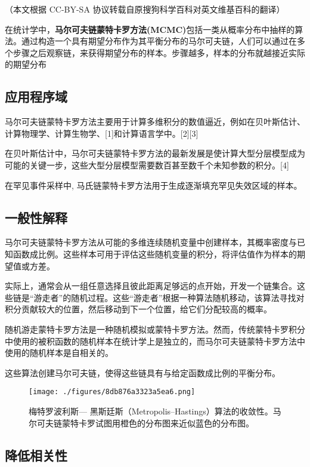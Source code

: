 
（本文根据 CC-BY-SA 协议转载自原搜狗科学百科对英文维基百科的翻译）

在统计学中，\textbf{马尔可夫链蒙特卡罗方法(MCMC)}包括一类从概率分布中抽样的算法。通过构造一个具有期望分布作为其平衡分布的马尔可夫链，人们可以通过在多个步骤之后观察链，来获得期望分布的样本。步骤越多，样本的分布就越接近实际的期望分布

\subsection{应用程序域}

马尔可夫链蒙特卡罗方法主要用于计算多维积分的数值逼近，例如在贝叶斯估计、计算物理学、计算生物学、[1]和计算语言学中。[2][3]

在贝叶斯估计中，马尔可夫链蒙特卡罗方法的最新发展是使计算大型分层模型成为可能的关键一步，这些大型分层模型需要数百甚至数千个未知参数的积分。[4]

在罕见事件采样中, 马氏链蒙特卡罗方法用于生成逐渐填充罕见失效区域的样本。

\subsection{一般性解释}

马尔可夫链蒙特卡罗方法从可能的多维连续随机变量中创建样本，其概率密度与已知函数成比例。这些样本可用于评估这些随机变量的积分，将评估值作为样本的期望值或方差。

实际上，通常会从一组任意选择且彼此距离足够远的点开始，开发一个链集合。这些链是“游走者”的随机过程。这些“游走者”根据一种算法随机移动，该算法寻找对积分贡献较大的位置，然后移动到下一个位置，给它们分配较高的概率。

随机游走蒙特卡罗方法是一种随机模拟或蒙特卡罗方法。然而，传统蒙特卡罗积分中使用的被积函数的随机样本在统计学上是独立的，而马尔可夫链蒙特卡罗方法中使用的随机样本是自相关的。

这些算法创建马尔可夫链，使得这些链具有与给定函数成比例的平衡分布。

\begin{figure}[ht]
\centering
\texttt{[image: ./figures/8db876a3323a5ea6.png]}
\caption{梅特罗波利斯— 黑斯廷斯（Metropolis–Hastings）算法的收敛性。马尔可夫链蒙特卡罗试图用橙色的分布图来近似蓝色的分布图。} \label{fig_MCMC1_1}
\end{figure}

\subsection{降低相关性}


